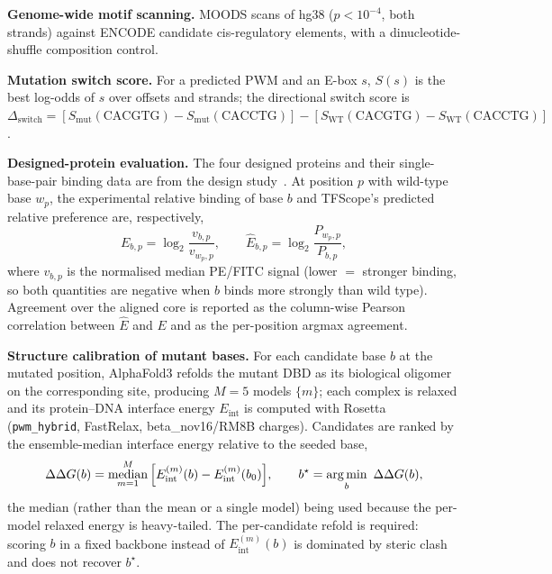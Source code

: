 \documentclass[11pt,letterpaper]{article}
\begin{document}
\noindent\textbf{Genome-wide motif scanning.} MOODS scans of hg38 ($p<10^{-4}$, both strands)
against ENCODE candidate cis-regulatory elements, with a dinucleotide-shuffle composition control.

\noindent\textbf{Mutation switch score.} For a predicted PWM and an E-box $s$, $S(s)$ is the best
log-odds of $s$ over offsets and strands; the directional switch score is
$\Delta_{\text{switch}}=[S_{\text{mut}}(\text{CACGTG})-S_{\text{mut}}(\text{CACCTG})]-
[S_{\text{WT}}(\text{CACGTG})-S_{\text{WT}}(\text{CACCTG})]$.

\noindent\textbf{Designed-protein evaluation.} The four designed proteins and their
single-base-pair binding data are from the design study~\cite{Glasscock2025}. At position $p$ with
wild-type base $w_p$, the experimental relative binding of base $b$ and TFScope's predicted relative
preference are, respectively,
\begin{equation}
E_{b,p}=\log_2\!\frac{v_{b,p}}{v_{w_p,p}},\qquad
\hat E_{b,p}=\log_2\!\frac{P_{w_p,p}}{P_{b,p}},
\end{equation}
where $v_{b,p}$ is the normalised median PE/FITC signal (lower $=$ stronger binding, so both
quantities are negative when $b$ binds more strongly than wild type). Agreement over the aligned
core is reported as the column-wise Pearson correlation between $\hat E$ and $E$ and as the
per-position argmax agreement.

\noindent\textbf{Structure calibration of mutant bases.} For each candidate base $b$ at the mutated
position, AlphaFold3 refolds the mutant DBD as its biological oligomer on the corresponding site,
producing $M{=}5$ models $\{m\}$; each complex is relaxed and its protein--DNA interface energy
$E_{\mathrm{int}}$ is computed with Rosetta (\texttt{pwm\_hybrid}, FastRelax, beta\_nov16/RM8B
charges). Candidates are ranked by the ensemble-median interface energy relative to the seeded base,
\begin{equation}
\Delta\Delta G(b)=\operatorname*{median}_{m=1}^{M}\Big[E_{\mathrm{int}}^{(m)}(b)-E_{\mathrm{int}}^{(m)}(b_0)\Big],
\qquad b^\star=\operatorname*{arg\,min}_{b}\ \Delta\Delta G(b),
\end{equation}
the median (rather than the mean or a single model) being used because the per-model relaxed energy
is heavy-tailed. The per-candidate refold is required: scoring $b$ in a fixed backbone instead of
$E_{\mathrm{int}}^{(m)}(b)$ is dominated by steric clash and does not recover $b^\star$.

\end{document}
